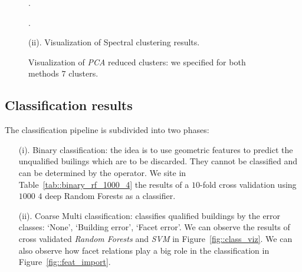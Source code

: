 \documentclass[../main.tex]{subfile}
\begin{document}
\begin{figure}[H]
{{\begin{subfloatrow}[2]
                    {
                        \caption{.}\label{fig::spectral_1}
                    }
                    {
                        \caption{.}\label{fig::spectral_2}
                    }
                \end{subfloatrow}
            }
            {
                \caption*{(ii). Visualization of Spectral clustering results.}
            }
        }
        {
            \caption{\label{fig::clust_viz} Visualization of \textit{PCA} reduced clusters: we specified for both methods $7$ clusters.}
        }
    \end{figure}

    \subsection{Classification results}

    The classification pipeline is subdivided into two phases:

    \begin{itemize}
        \item[(i).] Binary classification: the idea is to use geometric features to predict the unqualified builings which are to be discarded. They cannot be classified and can be determined by the operator. We site in Table~\ref{tab::binary_rf_1000_4} the results of a $10$-fold cross validation using $1000$ $4$ deep Random Forests as a classifier.

        \item[(ii).] Coarse Multi classification: classifies qualified buildings by the error classes: `None', `Building error', `Facet error'. We can observe the results of cross validated \textit{Random Forests} and \textit{SVM} in Figure~\ref{fig::class_viz}. We can also observe how facet relations play a big role in the classification in Figure~\ref{fig::feat_import}.
    \end{itemize}
\end{document}

